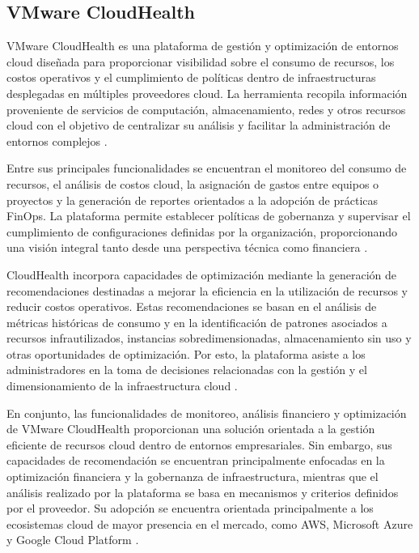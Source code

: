 \subsection{VMware CloudHealth}

VMware CloudHealth es una plataforma de gestión y optimización de entornos cloud diseñada para proporcionar visibilidad sobre el consumo de recursos, los costos operativos y el cumplimiento de políticas dentro de infraestructuras desplegadas en múltiples proveedores cloud. La herramienta recopila información proveniente de servicios de computación, almacenamiento, redes y otros recursos cloud con el objetivo de centralizar su análisis y facilitar la administración de entornos complejos \parencite{VMware2023}.

Entre sus principales funcionalidades se encuentran el monitoreo del consumo de recursos, el análisis de costos cloud, la asignación de gastos entre equipos o proyectos y la generación de reportes orientados a la adopción de prácticas FinOps. La plataforma permite establecer políticas de gobernanza y supervisar el cumplimiento de configuraciones definidas por la organización, proporcionando una visión integral tanto desde una perspectiva técnica como financiera \parencite{VMware2023}.

CloudHealth incorpora capacidades de optimización mediante la generación de recomendaciones destinadas a mejorar la eficiencia en la utilización de recursos y reducir costos operativos. Estas recomendaciones se basan en el análisis de métricas históricas de consumo y en la identificación de patrones asociados a recursos infrautilizados, instancias sobredimensionadas, almacenamiento sin uso y otras oportunidades de optimización. Por esto, la plataforma asiste a los administradores en la toma de decisiones relacionadas con la gestión y el dimensionamiento de la infraestructura cloud \parencite{VMware2023}.

En conjunto, las funcionalidades de monitoreo, análisis financiero y optimización de VMware CloudHealth proporcionan una solución orientada a la gestión eficiente de recursos cloud dentro de entornos empresariales. Sin embargo, sus capacidades de recomendación se encuentran principalmente enfocadas en la optimización financiera y la gobernanza de infraestructura, mientras que el análisis realizado por la plataforma se basa en mecanismos y criterios definidos por el proveedor. Su adopción se encuentra orientada principalmente a los ecosistemas cloud de mayor presencia en el mercado, como AWS, Microsoft Azure y Google Cloud Platform \parencite{VMware2023}.

